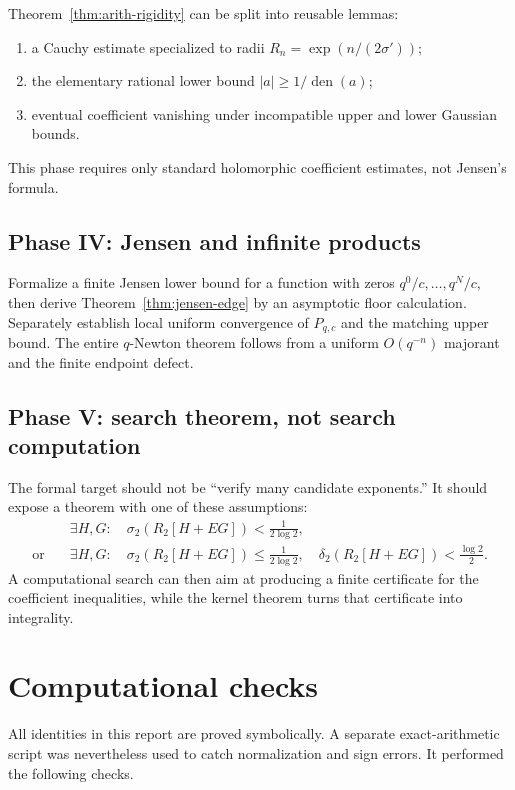 \documentclass[11pt]{article}
\theoremstyle{definition}
\newcommand{\den}{\operatorname{den}}
\begin{document}
Theorem~\ref{thm:arith-rigidity} can be split into reusable lemmas:
\begin{enumerate}
\item a Cauchy estimate specialized to radii \(R_n=\exp(n/(2\sigma'))\);
\item the elementary rational lower bound \(|a|\ge1/\den(a)\);
\item eventual coefficient vanishing under incompatible upper and lower Gaussian bounds.
\end{enumerate}
This phase requires only standard holomorphic coefficient estimates, not Jensen's formula.

\subsection{Phase IV: Jensen and infinite products}

Formalize a finite Jensen lower bound for a function with zeros \(q^0/c,\ldots,q^N/c\), then derive Theorem~\ref{thm:jensen-edge} by an asymptotic floor calculation.  Separately establish local uniform convergence of \(P_{q,c}\) and the matching upper bound.  The entire \(q\)-Newton theorem follows from a uniform \(O(q^{-n})\) majorant and the finite endpoint defect.

\subsection{Phase V: search theorem, not search computation}

The formal target should not be ``verify many candidate exponents.''  It should expose a theorem with one of these assumptions:
\begin{align*}
 &\exists H,G:\quad \sigma_2(R_2[H+EG])<\frac1{2\log2},\\
 \text{or}\quad
 &\exists H,G:\quad
   \sigma_2(R_2[H+EG])\le\frac1{2\log2},\quad
   \delta_2(R_2[H+EG])<\frac{\log2}{2}.
\end{align*}
A computational search can then aim at producing a finite certificate for the coefficient inequalities, while the kernel theorem turns that certificate into integrality.

\section{Computational checks}

All identities in this report are proved symbolically.  A separate exact-arithmetic script was nevertheless used to catch normalization and sign errors.  It performed the following checks.
\end{document}

